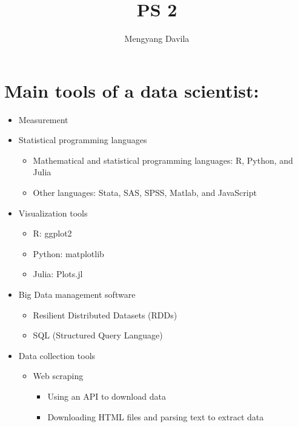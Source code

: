 \documentclass{article}
\title{PS 2}
\author{Mengyang Davila}
\begin{document}
\maketitle

\section*{Main tools of a data scientist:}
\begin{itemize}
  \item Measurement
  
  \item Statistical programming languages
  
  \begin{itemize}
  \item Mathematical and statistical programming languages: R, Python, and Julia
  \item Other languages: Stata, SAS, SPSS, Matlab, and JavaScript
  \end{itemize}


  \item Visualization tools 
    \begin{itemize}
    \item R: ggplot2
    \item Python: matplotlib
    \item Julia: Plots.jl
    \end{itemize}
  
  \item Big Data management software
    \begin{itemize}
    \item Resilient Distributed Datasets (RDDs)
    \item SQL (Structured Query Language)
    \end{itemize}
  
  \item Data collection tools
  \begin{itemize}
  \item Web scraping
    \begin{itemize}
    \item Using an API to download data
    \item Downloading HTML files and parsing text to extract data
    \end{itemize}
  \end{itemize}
  
\end{itemize}
\end{document}
